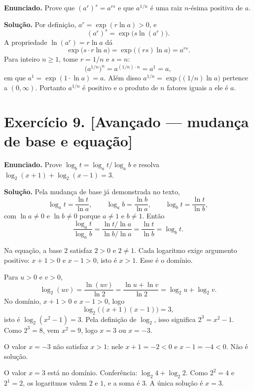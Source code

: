 \documentclass[11pt,a4paper]{article}
\begin{document}
\textbf{Enunciado.} Prove que $(a^r)^s=a^{rs}$ e que $a^{1/n}$ é uma raiz $n$-ésima positiva de $a$.

\textbf{Solução.}
Por definição, $a^r=\exp(r\ln a)>0$, e
\[
(a^r)^s=\exp\bigl(s\ln(a^r)\bigr).
\]
A propriedade $\ln(a^r)=r\ln a$ dá
\[
\exp\bigl(s\cdot r\ln a\bigr)=\exp\bigl((rs)\ln a\bigr)=a^{rs}.
\]
Para inteiro $n\ge 1$, tome $r=1/n$ e $s=n$:
\[
\bigl(a^{1/n}\bigr)^n=a^{(1/n)\cdot n}=a^{1}=a,
\]
em que $a^1=\exp(1\cdot\ln a)=a$. Além disso $a^{1/n}=\exp\bigl((1/n)\ln a\bigr)$ pertence a $(0,\infty)$. Portanto $a^{1/n}$ é positivo e o produto de $n$ fatores iguais a ele é $a$.

\section*{Exercício 9. [Avançado --- mudança de base e equação]}

\textbf{Enunciado.} Prove $\log_b t=\log_a t/\log_a b$ e resolva $\log_2(x+1)+\log_2(x-1)=3$.

\textbf{Solução.}
Pela mudança de base já demonstrada no texto,
\[
\log_a t=\frac{\ln t}{\ln a},\qquad \log_a b=\frac{\ln b}{\ln a},\qquad \log_b t=\frac{\ln t}{\ln b},
\]
com $\ln a\neq 0$ e $\ln b\neq 0$ porque $a\neq 1$ e $b\neq 1$. Então
\[
\frac{\log_a t}{\log_a b}
=\frac{\ln t/\ln a}{\ln b/\ln a}
=\frac{\ln t}{\ln b}
=\log_b t.
\]

Na equação, a base $2$ satisfaz $2>0$ e $2\neq 1$. Cada logaritmo exige argumento positivo: $x+1>0$ e $x-1>0$, isto é $x>1$. Esse é o domínio.

Para $u>0$ e $v>0$,
\[
\log_2(uv)=\frac{\ln(uv)}{\ln 2}=\frac{\ln u+\ln v}{\ln 2}=\log_2 u+\log_2 v.
\]
No domínio, $x+1>0$ e $x-1>0$, logo
\[
\log_2\bigl((x+1)(x-1)\bigr)=3,
\]
isto é $\log_2(x^2-1)=3$. Pela definição de $\log_2$, isso significa $2^{3}=x^2-1$. Como $2^{3}=8$, vem $x^2=9$, logo $x=3$ ou $x=-3$.

O valor $x=-3$ não satisfaz $x>1$: nele $x+1=-2<0$ e $x-1=-4<0$. Não é solução.

O valor $x=3$ está no domínio. Conferência: $\log_2 4+\log_2 2$. Como $2^{2}=4$ e $2^{1}=2$, os logaritmos valem $2$ e $1$, e a soma é $3$. A única solução é $x=3$.
\end{document}
